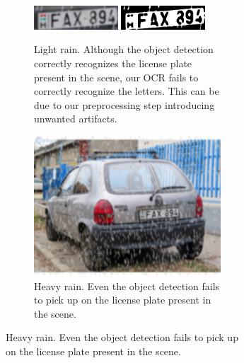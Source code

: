 \begin{figure}
\begin{subfigure}[t]{\textwidth}
\begin{subfigure}[t]{.4\textwidth}
            \includegraphics[width=0.45\textwidth]{figures/weather-results/cutouts/lightrain_0.jpg}
            \includegraphics[width=0.45\textwidth]{figures/weather-results/cleared/lightrain_0.jpg}
            \caption{Light rain. Although the object detection correctly
                recognizes the license plate present in the scene, our OCR fails
                to correctly recognize the letters. This can be due to our
                preprocessing step introducing unwanted artifacts.}
        \end{subfigure}
        \begin{subfigure}[t]{.4\textwidth}
            \centering
            \includegraphics[width=\textwidth]{figures/rain.jpg}
            \caption{Heavy rain. Even the object detection fails to pick up on
            the license plate present in the scene.}
        \end{subfigure}
        \label{fig:weather-raines}
    \end{subfigure}
    \begin{subfigure}[b]{\textwidth}
        \centering
        \begin{subfigure}[b]{.4\textwidth}
            \centering

\end{subfigure}
\end{subfigure}
\end{figure}
